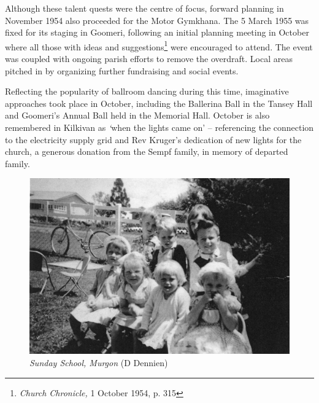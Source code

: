 Although these talent quests were the centre of focus, forward planning in November 1954 also proceeded for the Motor Gymkhana. The 5 March 1955 was fixed for its staging in Goomeri, following an initial planning meeting in October where all those with ideas and suggestions\footnote{\emph{Church Chronicle,} 1 October 1954, p. 315} were encouraged to attend. The event was coupled with ongoing parish efforts to remove the overdraft. Local areas pitched in by organizing further fundraising and social events.


Reflecting the popularity of ballroom dancing during this time, imaginative approaches took place in October, including the Ballerina Ball in the Tansey Hall and Goomeri's Annual Ball held in the Memorial Hall. October is also remembered in Kilkivan as \emph{`}when the lights came on' -- referencing the connection to the electricity supply grid and Rev Kruger's dedication of new lights for the church, a generous donation from the Sempf family, in memory of departed family.









\begin{figure}[!htb]
\begin{center}
\includegraphics[width=1.\textwidth,center]{../images/sundaySchoolMurgon.jpg}
\caption{{\itshape Sunday School, Murgon} {\scriptsize(D Dennien)}}
\end{center}
\end{figure}




